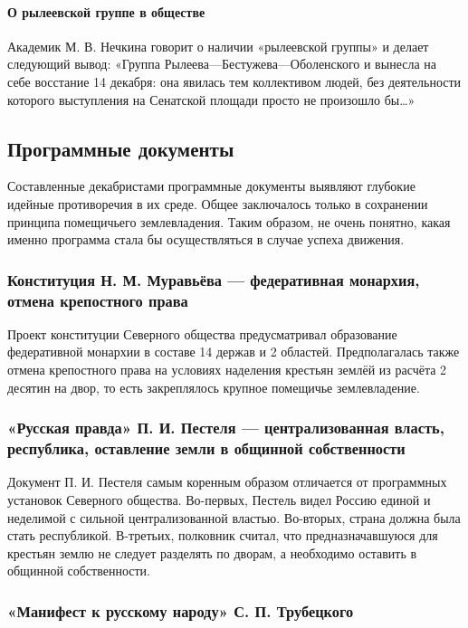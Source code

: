 \documentclass{article}
\begin{document}
\paragraph{О рылеевской группе в обществе}

Академик М. В. Нечкина говорит о наличии «рылеевской группы» и делает следующий вывод: «Группа Рылеева—Бестужева—Оболенского и вынесла на себе восстание 14 декабря: она явилась тем коллективом людей, без деятельности которого выступления на Сенатской площади просто не произошло бы…»

\subsection{Программные документы}

Составленные декабристами программные документы выявляют глубокие идейные противоречия в их среде. Общее заключалось только в сохранении принципа помещичьего землевладения. Таким образом, не очень понятно, какая именно программа стала бы осуществляться в случае успеха движения.

\subsubsection{Конституция Н. М. Муравьёва — федеративная монархия, отмена крепостного права}

Проект конституции Северного общества предусматривал образование федеративной монархии в составе 14 держав и 2 областей. Предполагалась также отмена крепостного права на условиях наделения крестьян землёй из расчёта 2 десятин на двор, то есть закреплялось крупное помещичье землевладение.

\subsubsection{«Русская правда» П. И. Пестеля — централизованная власть, республика, оставление земли в общинной собственности}

Документ П. И. Пестеля самым коренным образом отличается от программных установок Северного общества. Во-первых, Пестель видел Россию единой и неделимой с сильной централизованной властью. Во-вторых, страна должна была стать республикой. В-третьих, полковник считал, что предназначавшуюся для крестьян землю не следует разделять по дворам, а необходимо оставить в общинной собственности.

\subsubsection{«Манифест к русскому народу» С. П. Трубецкого}
\end{document}
